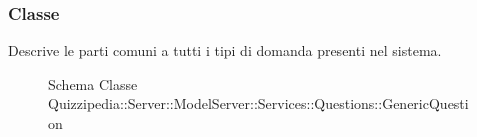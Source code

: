 \subsubsection{Classe }
Descrive le parti comuni a tutti i tipi di domanda presenti nel sistema.
\begin{figure}[H]
\centering
\noindent{}
\caption[Schema Classe GenericQuestion]{Schema Classe Quizzipedia::Server::ModelServer::Services::Questions::GenericQuestion}
\end{figure}

